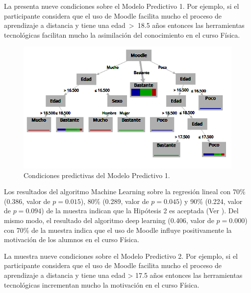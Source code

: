 \documentclass[spanish]{textolivre}
\begin{document}
La  presenta nueve condiciones sobre el Modelo Predictivo 1. Por ejemplo, si el participante considera que el uso de Moodle facilita mucho el proceso de aprendizaje a distancia y tiene una edad~>~18.5 años entonces las herramientas tecnológicas facilitan mucho la asimilación del conocimiento en el curso Física.

\begin{figure}[htbp]
\centering
\begin{minipage}{.85\textwidth}
 \includegraphics[width=\textwidth]{Image5.png}
 \caption{Condiciones predictivas del Modelo Predictivo 1.}
 \label{fig05}
\end{minipage}
\end{figure}

Los resultados del algoritmo Machine Learning sobre la regresión lineal con 70\% (0.386, valor de $p = 0.015$), 80\% (0.289, valor de $p = 0.045$) y 90\% (0.224, valor de $p = 0.094$) de la muestra indican que la Hipótesis 2 es aceptada (Ver ). Del mismo modo, el resultado del algoritmo deep learning (0.406, valor de $p = 0.000$) con 70\% de la muestra indica que el uso de Moodle influye positivamente la motivación de los alumnos en el curso Física.

La  muestra nueve condiciones sobre el Modelo Predictivo 2. Por ejemplo, si el participante considera que el uso de Moodle facilita mucho el proceso de aprendizaje a distancia y tiene una edad > 17.5 años entonces las herramientas tecnológicas incrementan mucho la motivación en el curso Física.
\end{document}
